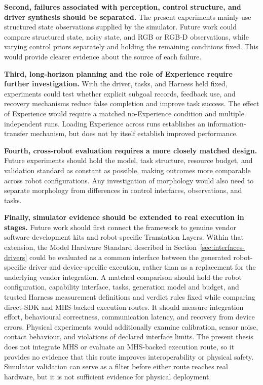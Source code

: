 \textbf{Second, failures associated with perception, control structure, and
driver synthesis should be separated.} The present experiments mainly use
structured state observations supplied by the simulator. Future work could
compare structured state, noisy state, and RGB or RGB-D observations, while
varying control priors separately and holding the remaining conditions fixed.
This would provide clearer evidence about the source of each failure.

\textbf{Third, long-horizon planning and the role of Experience require
further investigation.} With the driver, tasks, and Harness held fixed,
experiments could test whether explicit subgoal records, feedback use, and
recovery mechanisms reduce false completion and improve task success. The
effect of Experience would require a matched no-Experience condition and
multiple independent runs. Loading Experience across runs establishes an
information-transfer mechanism, but does not by itself establish improved
performance.

\textbf{Fourth, cross-robot evaluation requires a more closely matched
design.} Future experiments should hold the model, task structure, resource
budget, and validation standard as constant as possible, making outcomes more
comparable across robot configurations. Any investigation of morphology would
also need to separate morphology from differences in control interfaces,
observations, and tasks.

\textbf{Finally, simulator evidence should be extended to real execution in
stages.} Future work should first connect the framework to genuine vendor
software development kits and robot-specific Translation Layers. Within that
extension, the Model Hardware Standard described in
Section~\ref{sec:interfaces-drivers} could be evaluated as a common interface
between the generated robot-specific driver and device-specific execution,
rather than as a replacement for the underlying vendor integration. A matched
comparison should hold the robot configuration, capability interface, tasks,
generation model and budget, and trusted Harness measurement definitions and
verdict rules fixed while comparing direct-SDK and MHS-backed execution routes.
It should measure integration effort, behavioural correctness, communication
latency, and recovery from device errors. Physical experiments would
additionally examine calibration, sensor noise, contact behaviour, and
violations of declared interface limits. The present thesis does not integrate
MHS or evaluate an MHS-backed execution route, so it provides no evidence that
this route improves interoperability or physical safety. Simulator validation
can serve as a filter before either route reaches real hardware, but it is not
sufficient evidence for physical deployment.
